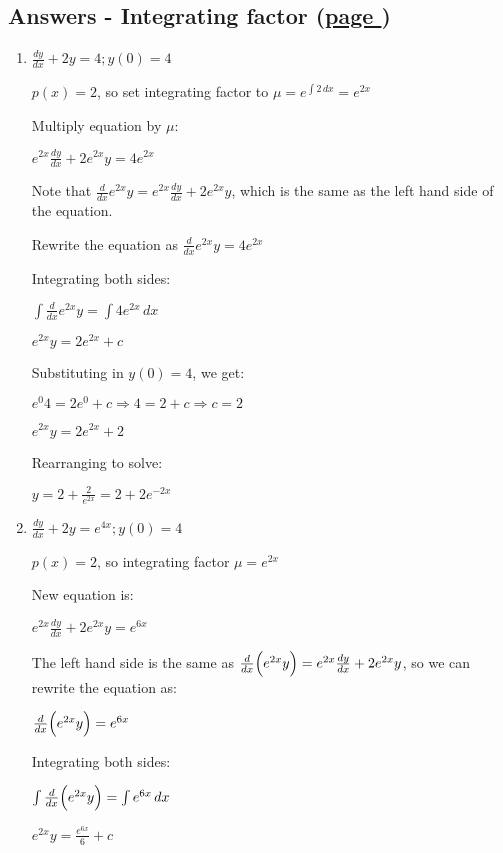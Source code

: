 \documentclass[../main.tex]{subfiles}
\begin{document}
\hypertarget{integratingfactoranswers}{\subsection*{Answers - Integrating factor (\hyperlink{integratingfactorlink}{page \pageref{Integrating factor method}})}}

\label{Integrating factor answers}
\begin{enumerate}[itemsep=0.7cm]
    \item 
    $\frac{dy}{dx}+2y=4; y(0)=4$

    $p(x)=2$, so set integrating factor to $\mu=e^{\int 2\,dx}=e^{2x}$

    Multiply equation by $\mu$:

    $e^{2x}\frac{dy}{dx}+2e^{2x}y=4e^{2x}$

    Note that $\frac{d}{dx}e^{2x}y=e^{2x}\frac{dy}{dx}+2e^{2x}y$, which is the same as the left hand side of the equation.

    Rewrite the equation as $\frac{d}{dx}e^{2x}y=4e^{2x}$

    Integrating both sides:

    $\int \frac{d}{dx}e^{2x}y=\int 4e^{2x}\,dx$

    $e^{2x}y=2e^{2x}+c$

    Substituting in $y(0)=4$, we get:

    $e^{0}4=2e^{0}+c \Rightarrow 4=2+c \Rightarrow c=2$

    $e^{2x}y=2e^{2x}+2$

    Rearranging to solve:

    $y=2+\frac{2}{e^{2x}}=2+2e^{-2x}$


    \item 
    $\frac{dy}{dx}+2y=e^{4x}; y(0)=4$

    $p(x)=2$, so integrating factor $\mu=e^{2x}$

    New equation is:

    $e^{2x}\frac{dy}{dx}+2e^{2x}y=e^{6x}$

    The left hand side is the same as $\frac{d}{dx}\Bigl(e^{2x}y\Bigr)=e^{2x}\frac{dy}{dx}+2e^{2x}y$, so we can rewrite the equation as:

    $\frac{d}{dx}\Bigl(e^{2x}y\Bigr)=e^{6x}$

    Integrating both sides:

    $\int \frac{d}{dx}\Bigl(e^{2x}y\Bigr)=\int e^{6x}\,dx$

    $e^{2x}y=\frac{e^{6x}}{6}+c$


\end{enumerate}
\end{document}
